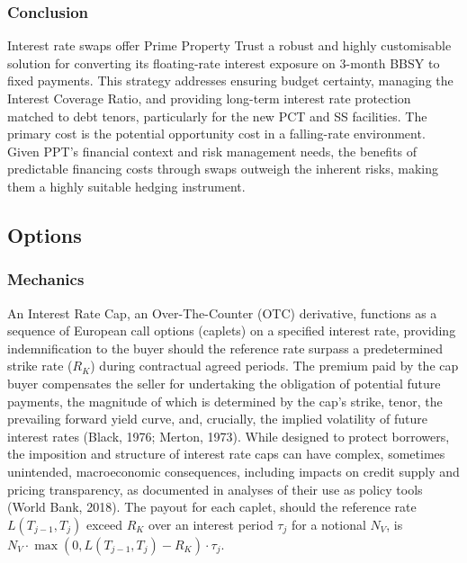 \documentclass[11pt, a4paper, british]{article}
\begin{document}
\subsubsection{Conclusion}
Interest rate swaps offer Prime Property Trust a robust and highly customisable solution for converting its floating-rate interest exposure on 3-month BBSY to fixed payments. This strategy addresses ensuring budget certainty, managing the Interest Coverage Ratio, and providing long-term interest rate protection matched to debt tenors, particularly for the new PCT and SS facilities. The primary cost is the potential opportunity cost in a falling-rate environment. Given PPT's financial context and risk management needs, the benefits of predictable financing costs through swaps outweigh the inherent risks, making them a highly suitable hedging instrument.

\newpage

\subsection{Options}

\subsubsection{Mechanics}
An Interest Rate Cap, an Over-The-Counter (OTC) derivative, functions as a sequence of European call options (caplets) on a specified interest rate, providing indemnification to the buyer should the reference rate surpass a predetermined strike rate ($R_K$) during contractual agreed periods. The premium paid by the cap buyer compensates the seller for undertaking the obligation of potential future payments, the magnitude of which is determined by the cap's strike, tenor, the prevailing forward yield curve, and, crucially, the implied volatility of future interest rates (Black, 1976; Merton, 1973). While designed to protect borrowers, the imposition and structure of interest rate caps can have complex, sometimes unintended, macroeconomic consequences, including impacts on credit supply and pricing transparency, as documented in analyses of their use as policy tools (World Bank, 2018). The payout for each caplet, should the reference rate $L(T_{j-1}, T_j)$ exceed $R_K$ over an interest period $\tau_j$ for a notional $N_V$, is $N_V \cdot \max(0, L(T_{j-1}, T_j) - R_K) \cdot \tau_j$.
\end{document}

